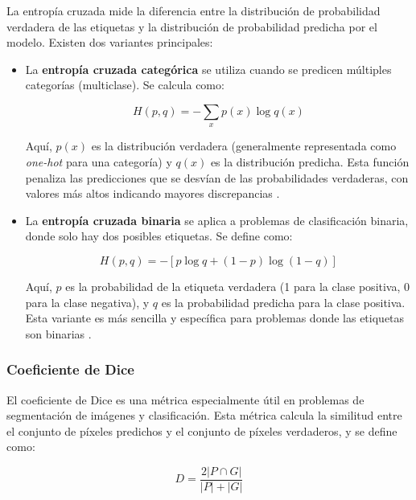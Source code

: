 La entropía cruzada mide la diferencia entre la distribución de probabilidad verdadera de las etiquetas y la distribución de probabilidad predicha por el modelo. Existen dos variantes principales:

\begin{itemize}
	\item La \textbf{entropía cruzada categórica} se utiliza cuando se predicen múltiples categorías (multiclase). Se calcula como:

	\begin{equation}
    		H(p, q) = -\sum_{x} p(x) \log q(x)
	\end{equation}

	Aquí, \(p(x)\) es la distribución verdadera (generalmente representada como \textit{one-hot} para una categoría) y \(q(x)\) es la distribución predicha. Esta función penaliza las predicciones que se desvían de las probabilidades verdaderas, con valores más altos indicando mayores discrepancias \citep{pajares2021aprendizaje}. 

	\item La\textbf{ entropía cruzada binaria} se aplica a problemas de clasificación binaria, donde solo hay dos posibles etiquetas. Se define como:

	\begin{equation}
    		H(p, q) = - \left[ p \log q + (1 - p) \log (1 - q) \right]
	\end{equation}

	Aquí, \(p\) es la probabilidad de la etiqueta verdadera (1 para la clase positiva, 0 para la clase negativa), y \(q\) es la probabilidad predicha para la clase positiva. Esta variante es más sencilla y específica para problemas donde las etiquetas son binarias \citep{pajares2021aprendizaje}.
\end{itemize}



\subsubsection{Coeficiente de Dice}

El coeficiente de Dice es una métrica especialmente útil en problemas de segmentación de imágenes y clasificación. Esta métrica calcula la similitud entre el conjunto de píxeles predichos y el conjunto de píxeles verdaderos, y se define como:

\begin{equation}
    D = \frac{2 |P \cap G|}{|P| + |G|}
\end{equation}

